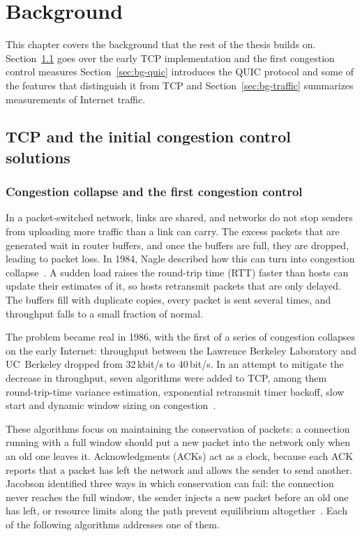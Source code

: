 \chapter{Background}\label{chap:background}

This chapter covers the background that the rest of the thesis builds on. Section~\ref{sec:bg-tcp-cc} goes over the early TCP implementation and the first congestion control measures Section~\ref{sec:bg-quic} introduces the QUIC protocol and some of the features that distinguish it from TCP and Section~\ref{sec:bg-traffic} summarizes measurements of Internet traffic.

\section{TCP and the initial congestion control solutions}\label{sec:bg-tcp-cc}

\subsection{Congestion collapse and the first congestion control}\label{sec:bg-origins}

In a packet-switched network, links are shared, and networks do not stop
senders from uploading more traffic than a link can carry. The excess packets that are generated wait in
router buffers, and once the buffers are full, they are dropped, leading to packet loss. In 1984, Nagle described how this can turn into congestion collapse~\cite{rfc896}. A sudden load
raises the round-trip time (RTT) faster than hosts can update their estimates of
it, so hosts retransmit packets that are only delayed. The buffers fill with
duplicate copies, every packet is sent several times, and throughput falls to a
small fraction of normal.

The problem became real in 1986, with the first of a series of congestion
collapses on the early Internet: throughput between
the Lawrence Berkeley Laboratory and UC~Berkeley dropped from 32\,kbit/s to 40\,bit/s. 
In an attempt to mitigate the decrease in throughput, seven algorithms were added to TCP, among them round-trip-time variance estimation, exponential retransmit timer backoff, slow start and dynamic window sizing on congestion~\cite{jacobson1988congestion}.

These algorithms focus on maintaining the conservation of packets: a
connection running with a full window should put a new packet
into the network only when an old one leaves it. Acknowledgments (ACKs) act
as a clock, because each ACK reports that a packet has left the network and
allows the sender to send another. Jacobson identified three ways in which
conservation can fail: the connection never reaches the full window, the sender
injects a new packet before an old one has left, or resource limits along the path
prevent equilibrium altogether~\cite{jacobson1988congestion}. Each of the following algorithms addresses one of them.

